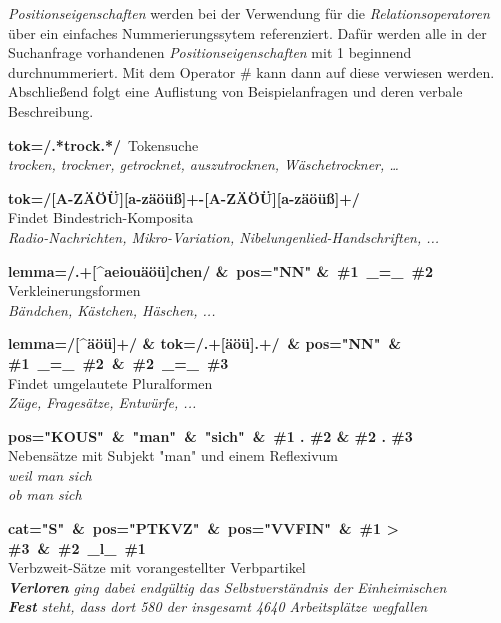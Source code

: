\emph{Positionseigenschaften} werden bei der Verwendung für die \emph{Relationsoperatoren} über ein einfaches Nummerierungssytem referenziert. Dafür werden alle in der Suchanfrage vorhandenen \emph{Positionseigenschaften} mit 1 beginnend durchnummeriert. Mit dem Operator \# kann dann auf diese verwiesen werden. Abschließend folgt eine Auflistung von Beispielanfragen und deren verbale Beschreibung.

\begin{description}
	\item{\textbf{tok=/.*trock.*/}\ Tokensuche\\ \emph{trocken, trockner, getrocknet, auszutrocknen, Wäschetrockner, …}}
	
	\item{\textbf{tok=/[A-ZÄÖÜ][a-zäöüß]+-[A-ZÄÖÜ][a-zäöüß]+/}\\ Findet Bindestrich-Komposita\\\emph{Radio-Nachrichten, Mikro-Variation, Nibelungenlied-Handschriften, ...}}
	
	\item{\textbf{lemma=/.+[\^{ }aeiouäöü]chen/ \&\ pos="NN" \&\ \#1\ \_=\_\ \#2}\\ Verkleinerungsformen\\ \emph{Bändchen, Kästchen, Häschen, ...}}
	
	\item{\textbf{lemma=/[\^{ }äöü]+/ \& tok=/.+[äöü].+/\ \& pos="NN"\ \& \#1\ \_=\_\ \#2\ \&\ \#2\ \_=\_\ \#3}\\ Findet umgelautete Pluralformen\\ \emph{Züge, Fragesätze, Entwürfe, ...}}
	
	\item{\textbf{pos="KOUS"\ \&\ "man"\ \&\ "{}sich"\ \&\ \#1 . \#2 \& \#2 . \#3}\\ Nebensätze mit Subjekt "man"{} und einem Reflexivum\\ \emph{weil man sich\\ ob man sich}}
	
	\newpage
	\item{\textbf{cat="{}S"\ \&\ pos="PTKVZ"\ \&\ pos="VVFIN"\ \&\ \#1 > \#3\ \&\ \#2\ \_l\_\ \#1}\\ Verbzweit-Sätze mit vorangestellter Verbpartikel\\ \emph{\textbf{Verloren} ging dabei endgültig das Selbstverständnis der Einheimischen}\\ 
	\emph{\textbf{Fest} steht, dass dort 580 der insgesamt 4640 Arbeitsplätze wegfallen}
	}
	

\end{description}
